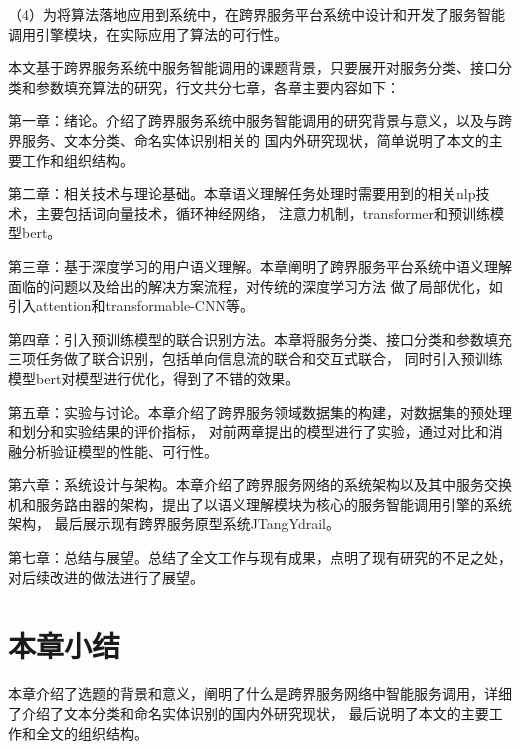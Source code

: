 （4）为将算法落地应用到系统中，在跨界服务平台系统中设计和开发了服务智能调用引擎模块，在实际应用了算法的可行性。

本文基于跨界服务系统中服务智能调用的课题背景，只要展开对服务分类、接口分类和参数填充算法的研究，行文共分七章，各章主要内容如下：

第一章：绪论。介绍了跨界服务系统中服务智能调用的研究背景与意义，以及与跨界服务、文本分类、命名实体识别相关的
国内外研究现状，简单说明了本文的主要工作和组织结构。

第二章：相关技术与理论基础。本章语义理解任务处理时需要用到的相关nlp技术，主要包括词向量技术，循环神经网络，
注意力机制，transformer和预训练模型bert。

第三章：基于深度学习的用户语义理解。本章阐明了跨界服务平台系统中语义理解面临的问题以及给出的解决方案流程，对传统的深度学习方法
做了局部优化，如引入attention和transformable-CNN等。

第四章：引入预训练模型的联合识别方法。本章将服务分类、接口分类和参数填充三项任务做了联合识别，包括单向信息流的联合和交互式联合，
同时引入预训练模型bert对模型进行优化，得到了不错的效果。

第五章：实验与讨论。本章介绍了跨界服务领域数据集的构建，对数据集的预处理和划分和实验结果的评价指标，
对前两章提出的模型进行了实验，通过对比和消融分析验证模型的性能、可行性。

第六章：系统设计与架构。本章介绍了跨界服务网络的系统架构以及其中服务交换机和服务路由器的架构，提出了以语义理解模块为核心的服务智能调用引擎的系统架构，
最后展示现有跨界服务原型系统JTangYdrail。

第七章：总结与展望。总结了全文工作与现有成果，点明了现有研究的不足之处，对后续改进的做法进行了展望。

\section{本章小结}
本章介绍了选题的背景和意义，阐明了什么是跨界服务网络中智能服务调用，详细了介绍了文本分类和命名实体识别的国内外研究现状，
最后说明了本文的主要工作和全文的组织结构。
